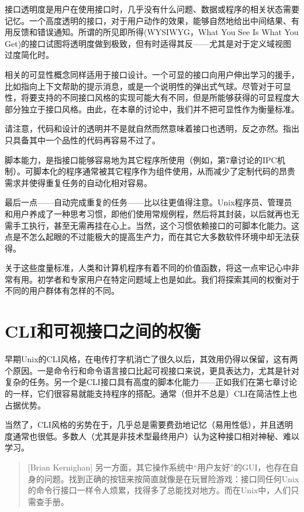 \documentclass[12pt,oneside]{book}
\begin{document}
接口透明度是用户在使用接口时，几乎没有什么问题、数据或程序的相关状态需要记忆。一个高度透明的接口，对于用户动作的效果，能够自然地给出中间结果、有用反馈和错误通知。所谓的所见即所得(WYSIWYG，What You See Is What You Get)的接口试图将透明度做到极致，但有时适得其反——尤其是对于定义域视图过度简化时。

相关的可显性概念同样适用于接口设计。一个可显的接口向用户伸出学习的援手，比如指向上下文帮助的提示消息，或是一个说明性的弹出式气球。尽管对于可显性，将要支持的不同接口风格的实现可能大有不同，但是所能够获得的可显程度大部分独立于接口风格。由此，在本章的讨论中，我们并不把可显性作为衡量标准。

请注意，代码和设计的透明并不是就自然而然意味着接口也透明，反之亦然。指出只具备其中一个品性的代码再容易不过了。

脚本能力，是指接口能够容易地为其它程序所使用（例如，第7章讨论的IPC机制）。可脚本化的程序通常被其它程序作为组件使用，从而减少了定制代码的昂贵需求并使得重复任务的自动化相对容易。

最后一点——自动完成重复的任务——比以往更值得注意。Unix程序员、管理员和用户养成了一种思考习惯，即他们使用常规例程，然后将其封装，以后就再也无需手工执行，甚至无需再挂在心上。当然，这个习惯依赖接口的可脚本化能力。这点是不怎么起眼的不过能极大的提高生产力，而在其它大多数软件环境中却无法获得。

关于这些度量标准，人类和计算机程序有着不同的价值函数，将这一点牢记心中非常有用。初学者和专家用户在特定问题域上也是如此。我们将探索其间的权衡对于不同的用户群体有怎样的不同。

\section{CLI和可视接口之间的权衡}
早期Unix的CLI风格，在电传打字机消亡了很久以后，其效用仍得以保留，这有两个原因。一是命令行和命令语言接口比起可视接口来说，更具表达力，尤其是针对复杂的任务。另一个是CLI接口具有高度的脚本化能力——正如我们在第七章讨论的一样，它们很容易就能支持程序的搭配。通常（但并不总是）CLI在简洁性上也占据优势。

当然了，CLI风格的劣势在于，几乎总是需要费劲地记忆（易用性低），并且透明度通常也很低。多数人（尤其是非技术型最终用户）认为这种接口相对神秘、难以学习。

\begin{quote}[Brian Kernighan]
另一方面，其它操作系统中“用户友好”的GUI，也存在自身的问题。找到正确的按钮来按简直就像是在玩冒险游戏：接口同任何Unix的命令行接口一样令人烦累，找得多了总能找对地方。而在Unix中，人们只需查手册。
\end{quote}
\end{document}
